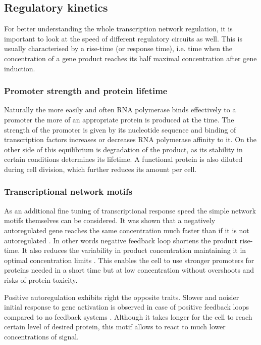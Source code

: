 \subsection{Regulatory kinetics}
For better understanding the whole transcription network regulation, it is important to look at the speed of different regulatory circuits as well.
This is usually characterised by a rise-time (or response time), i.e. time when the concentration of a gene product reaches its half maximal concentration after gene induction.

\subsubsection{Promoter strength and protein lifetime}
Naturally the more easily and often RNA polymerase binds effectively to a promoter the more of an appropriate protein is produced at the time.
The strength of the promoter is given by its nucleotide sequence and binding of transcription factors increases or decreases RNA polymerase affinity to it.
On the other side of this equilibrium is degradation of the product, as its stability in certain conditions determines its lifetime.
A functional protein is also diluted during cell division, which further reduces its amount per cell.

\subsubsection{Transcriptional network motifs}
As an additional fine tuning of transcriptional response speed the simple network motifs themselves can be considered.
It was shown that a negatively autoregulated gene reaches the same concentration much faster than if it is not autoregulated \cite{rosenfeld2002negative}.
In other words negative feedback loop shortens the product rise-time.
It also reduces the variability in product concentration maintaining it in optimal concentration limits \cite{becskei2000engineering}.
This enables the cell to use stronger promoters for proteins needed in a short time but at low concentration without overshoots and risks of protein toxicity.

Positive autoregulation exhibits right the opposite traits.
Slower and noisier initial response to gene activation is observed in case of positive feedback loops compared to no feedback systems \cite{maeda2006regulatory, sayut2007noise}.
Although it takes longer for the cell to reach certain level of desired protein, this motif allows to react to much lower concentrations of signal.


